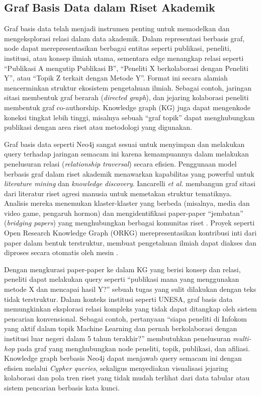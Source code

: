 \subsection{Graf Basis Data dalam Riset Akademik}

Graf basis data telah menjadi instrumen penting untuk memodelkan dan mengeksplorasi relasi dalam data akademik. Dalam representasi berbasis graf, node dapat merepresentasikan berbagai entitas seperti publikasi, peneliti, institusi, atau konsep ilmiah utama, sementara edge menangkap relasi seperti ``Publikasi A mengutip Publikasi B'', ``Peneliti X berkolaborasi dengan Peneliti Y'', atau ``Topik Z terkait dengan Metode Y''. Format ini secara alamiah mencerminkan struktur ekosistem pengetahuan ilmiah. Sebagai contoh, jaringan sitasi membentuk graf berarah (\textit{directed graph}), dan jejaring kolaborasi peneliti membentuk graf co-authorship. Knowledge graph (KG) juga dapat mengenkode koneksi tingkat lebih tinggi, misalnya sebuah ``graf topik'' dapat menghubungkan publikasi dengan area riset atau metodologi yang digunakan.

Graf basis data seperti Neo4j sangat sesuai untuk menyimpan dan melakukan query terhadap jaringan semacam ini karena kemampuannya dalam melakukan penelusuran relasi (\textit{relationship traversal}) secara efisien. Penggunaan model berbasis graf dalam riset akademik menawarkan kapabilitas yang powerful untuk \textit{literature mining} dan \textit{knowledge discovery}. Iancarelli \textit{et al.} membangun graf sitasi dari literatur riset agresi manusia untuk memetakan struktur tematiknya. Analisis mereka menemukan klaster-klaster yang berbeda (misalnya, media dan video game, pengaruh hormon) dan mengidentifikasi paper-paper ``jembatan'' (\textit{bridging papers}) yang menghubungkan berbagai komunitas riset \cite{pub.1147279270}. Proyek seperti Open Research Knowledge Graph (ORKG) merepresentasikan kontribusi inti dari paper dalam bentuk terstruktur, membuat pengetahuan ilmiah dapat diakses dan diproses secara otomatis oleh mesin \cite{Jaradeh_2019}.

Dengan mengkurasi paper-paper ke dalam KG yang berisi konsep dan relasi, peneliti dapat melakukan query seperti ``publikasi mana yang menggunakan metode X dan mencapai hasil Y?'' sebuah tugas yang sulit dilakukan dengan teks tidak terstruktur. Dalam konteks institusi seperti UNESA, graf basis data memungkinkan eksplorasi relasi kompleks yang tidak dapat ditangkap oleh sistem pencarian konvensional. Sebagai contoh, pertanyaan ``siapa peneliti di Infokom yang aktif dalam topik Machine Learning dan pernah berkolaborasi dengan institusi luar negeri dalam 5 tahun terakhir?'' membutuhkan penelusuran \textit{multi-hop} pada graf yang menghubungkan node peneliti, topik, publikasi, dan afiliasi. Knowledge graph berbasis Neo4j dapat menjawab query semacam ini dengan efisien melalui \textit{Cypher queries}, sekaligus menyediakan visualisasi jejaring kolaborasi dan pola tren riset yang tidak mudah terlihat dari data tabular atau sistem pencarian berbasis kata kunci.

